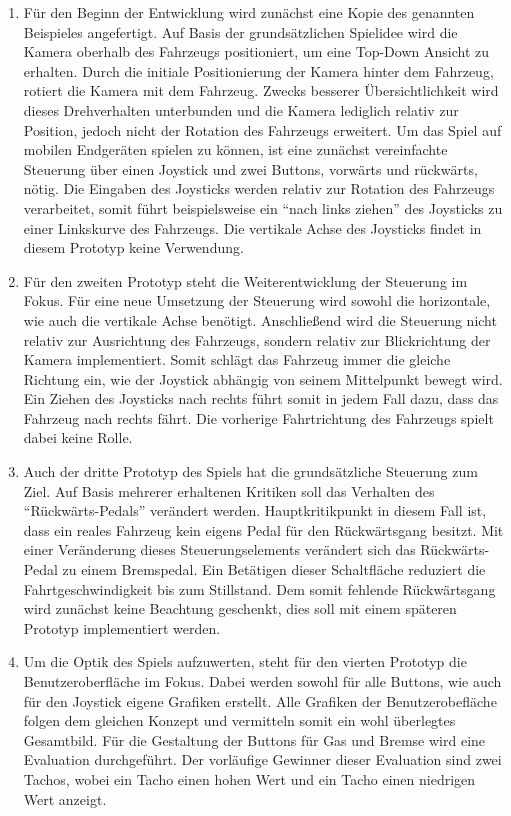 	\begin{enumerate}[itemindent=*,labelsep=\textwidth,label=\textbf{Prototyp \arabic*}]
		\item{ Für den Beginn der Entwicklung wird zunächst eine Kopie des genannten Beispieles angefertigt. Auf Basis der grundsätzlichen Spielidee wird die Kamera oberhalb des Fahrzeugs positioniert, um eine Top-Down Ansicht zu erhalten. Durch die initiale Positionierung der Kamera hinter dem Fahrzeug, rotiert die Kamera mit dem Fahrzeug. Zwecks besserer Übersichtlichkeit wird dieses Drehverhalten unterbunden und die Kamera lediglich relativ zur Position, jedoch nicht der Rotation des Fahrzeugs erweitert. Um das Spiel auf mobilen Endgeräten spielen zu können, ist eine zunächst vereinfachte Steuerung über einen Joystick und zwei Buttons, vorwärts und rückwärts, nötig. Die Eingaben des Joysticks werden relativ zur Rotation des Fahrzeugs verarbeitet, somit führt beispielsweise ein \enquote{nach links ziehen} des Joysticks zu einer Linkskurve des Fahrzeugs. Die vertikale Achse des Joysticks findet in diesem Prototyp keine Verwendung. }
		\item{ Für den zweiten Prototyp steht die Weiterentwicklung der Steuerung im Fokus. Für eine neue Umsetzung der Steuerung wird sowohl die horizontale, wie auch die vertikale Achse benötigt. Anschließend wird die Steuerung nicht relativ zur Ausrichtung des Fahrzeugs, sondern relativ zur Blickrichtung der Kamera implementiert. Somit schlägt das Fahrzeug immer die gleiche Richtung ein, wie der Joystick abhängig von seinem Mittelpunkt bewegt wird. Ein Ziehen des Joysticks nach rechts führt somit in jedem Fall dazu, dass das Fahrzeug nach rechts fährt. Die vorherige Fahrtrichtung des Fahrzeugs spielt dabei keine Rolle. }
		\item{ Auch der dritte Prototyp des Spiels hat die grundsätzliche Steuerung zum Ziel. Auf Basis mehrerer erhaltenen Kritiken soll das Verhalten des \enquote{Rückwärts-Pedals} verändert werden. Hauptkritikpunkt in diesem Fall ist, dass ein reales Fahrzeug kein eigens Pedal für den Rückwärtsgang besitzt. Mit einer Veränderung dieses Steuerungselements verändert sich das Rückwärts-Pedal zu einem Bremspedal. Ein Betätigen dieser Schaltfläche reduziert die Fahrtgeschwindigkeit bis zum Stillstand. Dem somit fehlende Rückwärtsgang wird zunächst keine Beachtung geschenkt, dies soll mit einem späteren Prototyp implementiert werden.}
		\item{ Um die Optik des Spiels aufzuwerten, steht für den vierten Prototyp die Benutzeroberfläche im Fokus. Dabei werden sowohl für alle Buttons, wie auch für den Joystick eigene Grafiken erstellt. Alle Grafiken der Benutzerobefläche folgen dem gleichen Konzept und vermitteln somit ein wohl überlegtes Gesamtbild. Für die Gestaltung der Buttons für Gas und Bremse wird eine Evaluation durchgeführt. Der vorläufige Gewinner dieser Evaluation sind zwei Tachos, wobei ein Tacho einen hohen Wert und ein Tacho einen niedrigen Wert anzeigt. }

\end{enumerate}
